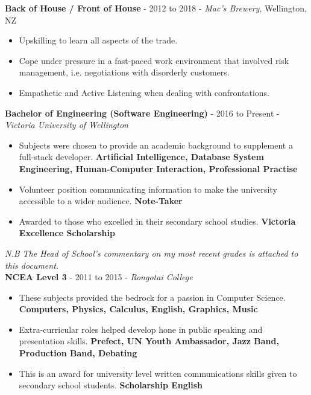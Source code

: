 \documentclass[9pt]{developercv}
\begin{document}
\textbf{Back of House / Front of House} - 2012 to 2018 - \emph{Mac's Brewery}, Wellington, NZ
\begin{itemize}
	\item Upskilling to learn all aspects of the trade.
	\item Cope under pressure in a fast-paced work environment that involved risk management, i.e. negotiations with disorderly customers.
	\item Empathetic and Active Listening when dealing with confrontations.
\end{itemize}



\textbf{Bachelor of Engineering (Software Engineering)} - 2016 to Present - \emph{Victoria University of Wellington}
\begin{itemize}
	\item Subjects were chosen to provide an academic background to supplement a full-stack developer. \textbf{Artificial Intelligence, Database System Engineering, Human-Computer Interaction, Professional Practise}
	\item Volunteer position communicating information to make the university accessible to a wider audience. \textbf{Note-Taker}
	\item Awarded to those who excelled in their secondary school studies. \textbf{Victoria Excellence Scholarship}
\end{itemize}
\emph{N.B The Head of School's commentary on my most recent grades is attached to this document.} \\

\textbf{NCEA Level 3} - 2011 to 2015 - \emph{Rongotai College}
\begin{itemize}
	\item These subjects provided the bedrock for a passion in Computer Science. \textbf{Computers, Physics, Calculus, English, Graphics, Music}
	\item Extra-curricular roles helped develop hone in public speaking and presentation skills. \textbf{Prefect, UN Youth Ambassador, Jazz Band, Production Band, Debating}
	\item This is an award for university level written communications skills given to secondary school students. \textbf{Scholarship English}
\end{itemize}
\end{document}
